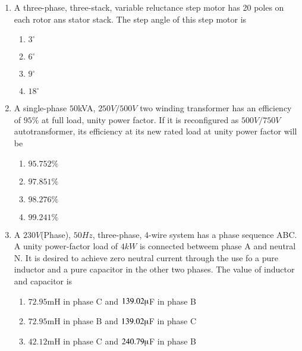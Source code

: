 \documentclass[journal]{IEEEtran}
\begin{document}
\begin{enumerate}
\begin{multicols}{2}
\begin{enumerate}
    \item $1.731$
    \item $1.5$
    \item $0.666$
    \item $0.577$
\end{enumerate}    
\end{multicols}
\item A three-phase, three-stack, variable reluctance step motor has 20 poles on each rotor ans stator stack. The step angle of this step motor is
\begin{multicols}{2}
\begin{enumerate}
    \item $3^\circ$
    \item $6^\circ$
    \item $9^\circ$
    \item $18^\circ$
\end{enumerate}    
\end{multicols}
\item A single-phase $50$kVA, $250V/500V$ two winding transformer has an efficiency of $95\%$ at full load, unity power factor. If it is reconfigured as $500V/750V$ autotransformer, its efficiency at its new rated load at unity power factor will be 
\begin{multicols}{2}
\begin{enumerate}
  \item $95.752\%$
    \item $97.851\%$
    \item $98.276\%$
    \item $99.241\%$
\end{enumerate}    
\end{multicols}
\item A $230V$(Phase), $50Hz$, three-phase, 4-wire system has a phase sequence ABC. A unity power-factor load of $4kW$ is connected betweem phase A and neutral N. It is desired to achieve zero neutral current through the use fo a pure inductor and a pure capacitor in the other two phases. The value of inductor and capacitor is 
\begin{enumerate}
    \item $72.95$mH in phase C and $139.02\micro$F in phase B
     \item $72.95$mH in phase B and $139.02\micro$F in phase C
      \item $42.12$mH in phase C and $240.79\micro$F in phase B

\end{enumerate}
\end{enumerate}
\end{document}
